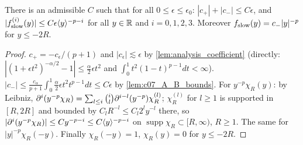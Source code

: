 \begin{lemma}
  \label{lem:c07_slow_bounds}
  There is an admissible $C$ such that for all $0\le\epsilon\le\epsilon_0$: $|c_+|+|c_-|\le C\epsilon$, and
  $|f_{\textup{slow}}^{(i)}(y)|\le C\epsilon\langle y \rangle^{-p-i}$ for all $y\in\mathbb{R}$ and $i=0,1,2,3$.
  Moreover $f_{\textup{slow}}(y)=c_-|y|^{-p}$ for $y\le-2R$.
\end{lemma}
\begin{proof}
  $c_+=-c_\epsilon/(p+1)$ and $|c_\epsilon|\lesssim\epsilon$ by \cref{lem:analysis_coefficient} (directly:
  $|(1+\epsilon t^2)^{-\alpha/2}-1|\le\frac\alpha2\epsilon t^2$ and $\int_0^1t^2(1-t)^{p-1}dt<\infty$).
  $|c_-|\le\frac{c_\alpha}{p+1}\int_0^1\frac\alpha2\epsilon t^{2}t^{p-1}dt\le C\epsilon$ by \cref{lem:c07_A_B_bounds}.
  For $y^{-p}\chi_R(y)$: by Leibniz, $\partial^i(y^{-p}\chi_R)=\sum_{l\le i}\binom il\partial^{i-l}(y^{-p})\chi_R^{(l)}$;
  $\chi_R^{(l)}$ for $l\ge1$ is supported in $[R,2R]$ and bounded by $C_lR^{-l}\le C_l2^ly^{-l}$ there,
  so $|\partial^i(y^{-p}\chi_R)|\le Cy^{-p-i}\le C\langle y \rangle^{-p-i}$ on $\operatorname{supp}\chi_R\subset[R,\infty)$, $R\ge1$.
  The same for $|y|^{-p}\chi_R(-y)$. Finally $\chi_R(-y)=1$, $\chi_R(y)=0$ for $y\le-2R$.
\end{proof}

